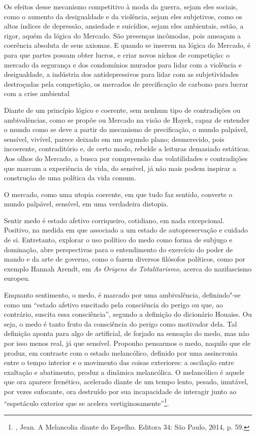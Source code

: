 Os efeitos desse mecanismo competitivo à moda da guerra, sejam eles
sociais, como o aumento da desigualdade e da violência, sejam eles
subjetivos, como os altos índices de depressão, ansiedade e suicídios,
sejam eles ambientais, estão, a rigor, aquém da lógica do Mercado. São
presenças incômodas, pois ameaçam a coerência absoluta de seus axiomas.
E quando se inserem na lógica do Mercado, é para que partes possam obter
lucros, e criar novos nichos de competição: o mercado da segurança e dos
condomínios murados para lidar com a violência e desigualdade, a
indústria dos antidepressivos para lidar com as subjetividades
destroçadas pela competição, os mercados de precificação de carbono para
lucrar com a crise ambiental

Diante de um princípio lógico e coerente, sem nenhum tipo de
contradições ou ambivalências, como se propõe ou Mercado na visão de
Hayek, capaz de entender o mundo como se deve a partir do mecanismo de
precificação, o mundo palpável, sensível, vivível, parece deixado em um
segundo plano; desmerecido, pois incoerente, contraditório e, de certo
modo, rebelde a leituras demasiado estáticas. Aos olhos do Mercado, a
busca por compreensão das volatilidades e contradições que marcam a
experiência de vida, do sensível, já não mais podem inspirar a
construção de uma política da vida comum.

O mercado, como uma utopia coerente, em que tudo faz sentido, converte o
mundo palpável, sensível, em uma verdadeira distopia.

\asterisc

Sentir medo é estado afetivo corriqueiro, cotidiano, em nada
excepcional. Positivo, na medida em que associado a um estado de
autopreservação e cuidado de si. Entretanto, explorar o uso político do
medo como forma de subjugo e dominação, abre perspectivas para o
entendimento do exercício do poder de mando e da arte de governo, como o
fazem diversos filósofos políticos, como por exemplo Hannah Arendt, em
\emph{As Origens do Totalitarismo}, acerca do nazifascismo europeu.

Enquanto sentimento, o medo, é marcado por uma ambivalência,
definindo"-se como um ``estado afetivo suscitado pela consciência do
perigo ou que, ao contrário, suscita essa consciência'', segundo a
definição do dicionário Houaiss. Ou seja, o medo é tanto fruto da
consciência do perigo como motivador dela. Tal definição aponta para
algo de artificial, de forjado na sensação do medo, mas não por isso
menos real, já que sensível. Proponho pensarmos o medo, naquilo que ele
produz, em contraste com o estado melancólico, definido por uma
assincronia entre o tempo interior e o movimento das coisas exteriores:
a oscilação entre exaltação e abatimento, produz a dinâmica melancólica.
O melancólico é aquele que ora aparece frenético, acelerado diante de um
tempo lento, pesado, imutável, por vezes sufocante, ora destruído por
sua incapacidade de interagir junto ao ``espetáculo exterior que se
acelera vertiginosamente''\footnote{, Jean. A Melancolia
  diante do Espelho. Editora 34: São Paulo, 2014, p. 59.}.

